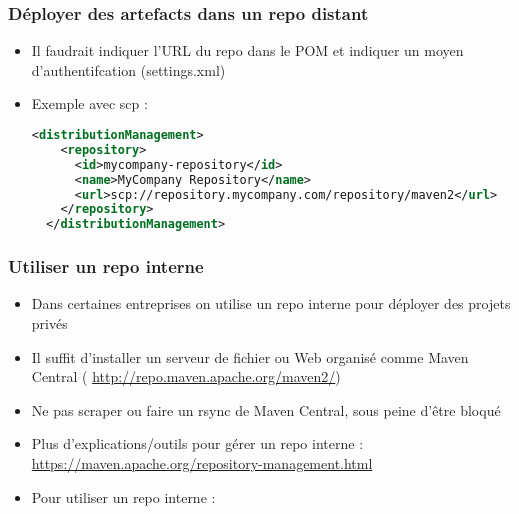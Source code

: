 \documentclass{beamer}
\begin{document}
\begin{frame}[fragile]
  \frametitle{Déployer des artefacts dans un repo distant}
  
  \begin{itemize}
  \item Il faudrait indiquer l'URL du repo dans le POM et indiquer un
    moyen d'authentifcation (settings.xml)
  \item Exemple avec scp :
\begin{lstlisting}[language=XML,basicstyle=\tiny]  
  <distributionManagement>
    <repository>
      <id>mycompany-repository</id>
      <name>MyCompany Repository</name>
      <url>scp://repository.mycompany.com/repository/maven2</url>
    </repository>
  </distributionManagement>
\end{lstlisting}    
\vspace{4cm}
  \end{itemize}
\end{frame}

\begin{frame}[fragile]
  \frametitle{Utiliser un repo interne}
  \begin{itemize}
  \item Dans certaines entreprises on utilise un repo interne pour
    déployer des projets privés 
    
  \item Il suffit d'installer un serveur de fichier ou Web organisé
    comme Maven Central ({\footnotesize
      \url{http://repo.maven.apache.org/maven2/}})
  \item Ne pas scraper ou faire un rsync de Maven Central, sous peine
    d'être bloqué
    \item Plus d'explications/outils pour gérer un repo interne :\\ {\footnotesize\url{https://maven.apache.org/repository-management.html}}
      \vspace{1cm}
    \item Pour utiliser un repo interne :
      \vspace{2cm}      
  \end{itemize}
\end{frame}
\end{document}
